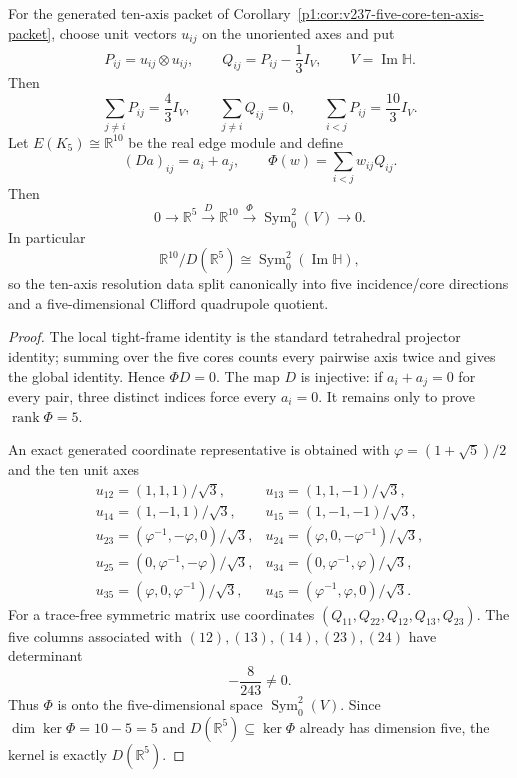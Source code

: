 \documentclass[11pt]{article}
\begin{document}
\begin{theorem}
\label{p1:thm:v285-ten-axis-quadrupole-exact-sequence}
For the generated ten-axis packet of
Corollary~\ref{p1:cor:v237-five-core-ten-axis-packet}, choose unit vectors
\(u_{ij}\) on the unoriented axes and put
\[
 P_{ij}=u_{ij}\otimes u_{ij},
 \qquad
 Q_{ij}=P_{ij}-\frac13I_V,
 \qquad V=\operatorname{Im}\mathbb H.
\]
Then
\[
 \sum_{j\ne i}P_{ij}=\frac43I_V,
 \qquad
 \sum_{j\ne i}Q_{ij}=0,
 \qquad
 \sum_{i<j}P_{ij}=\frac{10}{3}I_V.
\]
Let \(E(K_5)\cong\mathbb R^{10}\) be the real edge module and define
\[
 (Da)_{ij}=a_i+a_j,
 \qquad
 \Phi(w)=\sum_{i<j}w_{ij}Q_{ij}.
\]
Then
\begin{equation}
\label{p1:eq:v285-ten-axis-quadrupole-exact-sequence}
 \boxed{
 0\longrightarrow\mathbb R^5
 \xrightarrow{D}\mathbb R^{10}
 \xrightarrow{\Phi}\operatorname{Sym}^2_0(V)
 \longrightarrow0.}
\end{equation}
In particular
\[
 \boxed{\mathbb R^{10}/D(\mathbb R^5)
 \cong\operatorname{Sym}^2_0(\operatorname{Im}\mathbb H),}
\]
so the ten-axis resolution data split canonically into five incidence/core
directions and a five-dimensional Clifford quadrupole quotient.
\end{theorem}

\begin{proof}
The local tight-frame identity is the standard tetrahedral projector identity;
summing over the five cores counts every pairwise axis twice and gives the
global identity.  Hence \(\Phi D=0\).  The map \(D\) is injective: if
\(a_i+a_j=0\) for every pair, three distinct indices force every \(a_i=0\).
It remains only to prove \(\operatorname{rank}\Phi=5\).

An exact generated coordinate representative is obtained with
\(\varphi=(1+\sqrt5)/2\) and the ten unit axes
\[
\begin{array}{ll}
 u_{12}=(1,1,1)/\sqrt3,&u_{13}=(1,1,-1)/\sqrt3,\\
 u_{14}=(1,-1,1)/\sqrt3,&u_{15}=(1,-1,-1)/\sqrt3,\\
 u_{23}=(\varphi^{-1},-\varphi,0)/\sqrt3,&
 u_{24}=(\varphi,0,-\varphi^{-1})/\sqrt3,\\
 u_{25}=(0,\varphi^{-1},-\varphi)/\sqrt3,&
 u_{34}=(0,\varphi^{-1},\varphi)/\sqrt3,\\
 u_{35}=(\varphi,0,\varphi^{-1})/\sqrt3,&
 u_{45}=(\varphi^{-1},\varphi,0)/\sqrt3.
\end{array}
\]
For a trace-free symmetric matrix use coordinates
\((Q_{11},Q_{22},Q_{12},Q_{13},Q_{23})\).  The five columns associated with
\((12),(13),(14),(23),(24)\) have determinant
\[
 \boxed{-\frac{8}{243}\ne0.}
\]
Thus \(\Phi\) is onto the five-dimensional space
\(\operatorname{Sym}^2_0(V)\).  Since \(\dim\ker\Phi=10-5=5\) and
\(D(\mathbb R^5)\subseteq\ker\Phi\) already has dimension five, the kernel is
exactly \(D(\mathbb R^5)\).
\end{proof}
\end{document}
